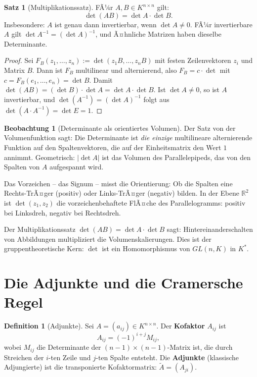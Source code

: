 ﻿\documentclass[a4paper,12pt]{report}
\theoremstyle{definition}
\newtheorem{definition}{Definition}
\newtheorem{satz}{Satz}
\newtheorem{beobachtung}{Beobachtung}
\begin{document}
\begin{satz}[Multiplikationssatz]
    FÃ¼r $A, B \in K^{n \times n}$ gilt:
    \[
        \det(AB) = \det A \cdot \det B.
    \]
    Insbesondere: $A$ ist genau dann invertierbar, wenn $\det A \neq 0$.
    FÃ¼r invertierbare $A$ gilt $\det A^{-1} = (\det A)^{-1}$,
    und Ã¤hnliche Matrizen haben dieselbe Determinante.
\end{satz}
\begin{proof}
    Sei $F_B(z_1, \ldots, z_n) := \det(z_1 B, \ldots, z_n B)$ mit festen Zeilenvektoren
    $z_i$ und Matrix $B$. Dann ist $F_B$ multilinear und alternierend, also
    $F_B = c \cdot \det$ mit $c = F_B(e_1, \ldots, e_n) = \det B$.
    Damit $\det(AB) = (\det B) \cdot \det A = \det A \cdot \det B$.
    Ist $\det A \neq 0$, so ist $A$ invertierbar, und $\det(A^{-1}) = (\det A)^{-1}$
    folgt aus $\det(A \cdot A^{-1}) = \det E = 1$.
\end{proof}

\begin{beobachtung}[Determinante als orientiertes Volumen]
    Der Satz von der Volumenfunktion sagt: Die Determinante ist
    \emph{die einzige} multilineare alternierende Funktion auf den
    Spaltenvektoren, die auf der Einheitsmatrix den Wert $1$ annimmt.
    Geometrisch: $|\det A|$ ist das Volumen des Parallelepipeds, das
    von den Spalten von $A$ aufgespannt wird.

    Das Vorzeichen -- das Signum -- misst die Orientierung: Ob die
    Spalten eine Rechts-TrÃ¤ger (positiv) oder Links-TrÃ¤ger (negativ) bilden.
    In der Ebene $\mathbb{R}^2$ ist $\det(z_1, z_2)$ die vorzeichenbehaftete
    FlÃ¤che des Parallelogramms: positiv bei Linksdreh, negativ bei Rechtsdreh.

    Der Multiplikationssatz $\det(AB) = \det A \cdot \det B$ sagt:
    Hintereinanderschalten von Abbildungen multipliziert die Volumenskalierungen.
    Dies ist der gruppentheoretische Kern: $\det$ ist ein Homomorphismus
    von $GL(n, K)$ in $K^*$.
\end{beobachtung}

\section{Die Adjunkte und die Cramersche Regel}

\begin{definition}[Adjunkte]
    Sei $A = (a_{ij}) \in K^{n \times n}$. Der \textbf{Kofaktor} $A_{ij}$ ist
    \[
        A_{ij} = (-1)^{i+j} M_{ij},
    \]
    wobei $M_{ij}$ die Determinante der $(n-1) \times (n-1)$-Matrix ist,
    die durch Streichen der $i$-ten Zeile und $j$-ten Spalte entsteht.
    Die \textbf{Adjunkte} (klassische Adjungierte) ist die transponierte
    Kofaktormatrix: $\tilde{A} = (A_{ji})$.
\end{definition}
\end{document}

